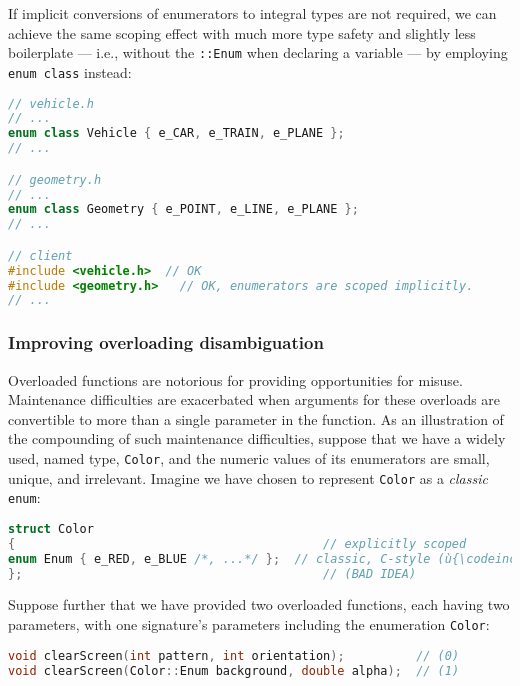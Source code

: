 \noindent If implicit conversions of enumerators to integral types are not
required, we can achieve the same scoping effect with much more type
safety and slightly less boilerplate --- i.e., without the
\texttt{::Enum} when declaring a variable --- by employing
\texttt{enum}~\texttt{class} instead:

\begin{lstlisting}[language=C++]
// vehicle.h
// ...
enum class Vehicle { e_CAR, e_TRAIN, e_PLANE };
// ...

// geometry.h
// ...
enum class Geometry { e_POINT, e_LINE, e_PLANE };
// ...

// client
#include <vehicle.h>  // OK
#include <geometry.h>   // OK, enumerators are scoped implicitly.
// ...
\end{lstlisting}

\subsubsection[Improving overloading disambiguation]{Improving overloading disambiguation}\label{improving-overloading-disambiguation}

Overloaded functions are notorious for providing opportunities for
misuse. Maintenance difficulties are exacerbated when arguments for
these overloads are convertible to more than a single parameter in the
function. As an illustration of the compounding of such maintenance
difficulties, suppose that we have a widely used, named type,
\texttt{Color}, and the numeric values of its enumerators are small,
unique, and irrelevant. Imagine we have chosen to represent
\texttt{Color} as a \emph{classic} \texttt{enum}:

\begin{lstlisting}[language=C++]
struct Color
{                                           // explicitly scoped
enum Enum { e_RED, e_BLUE /*, ...*/ };  // classic, C-style (ù{\codeincomments{enum}}ù)
};                                          // (BAD IDEA)
\end{lstlisting}

\noindent Suppose further that we have provided two overloaded functions, each
having two parameters, with one signature's parameters including the
enumeration \texttt{Color}:

\begin{lstlisting}[language=C++]
void clearScreen(int pattern, int orientation);          // (0)
void clearScreen(Color::Enum background, double alpha);  // (1)
\end{lstlisting}

